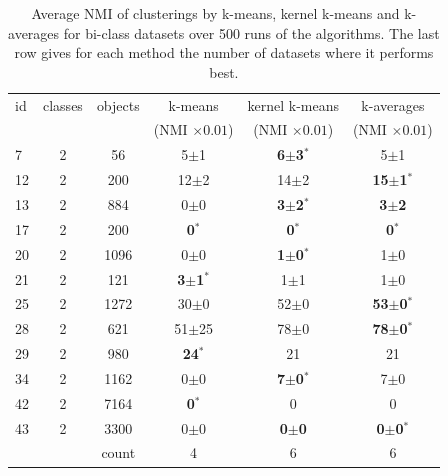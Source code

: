 \documentclass[a4paper,twoside]{article}
\begin{document}
\begin{table} 
\begin{center} 
\small 
 \setlength{\tabcolsep}{1em}
 \renewcommand{\arraystretch}{1.2}
\begin{tabular}{lccccc} 
id & classes & objects & k-means & kernel k-means & k-averages \\ 
&  &  & (NMI $\times 0.01$) & (NMI $\times 0.01$) & (NMI $\times 0.01$) \\ 
\hline 
 7 & 2 &   56 & 5$\pm$1 & \textbf{6$\pm$3$^*$} & 5$\pm$1 \\ 
12 & 2 &  200 & 12$\pm$2 & 14$\pm$2 & \textbf{15$\pm$1$^*$} \\ 
13 & 2 &  884 & 0$\pm$0 & \textbf{3$\pm$2$^*$} & \textbf{3$\pm$2} \\ 
17 & 2 &  200 & \textbf{0$^*$} & \textbf{0$^*$} & \textbf{0$^*$} \\ 
20 & 2 & 1096 & 0$\pm$0 & \textbf{1$\pm$0$^*$} & 1$\pm$0 \\ 
21 & 2 &  121 & \textbf{3$\pm$1$^*$} & 1$\pm$1 & 1$\pm$0 \\ 
25 & 2 & 1272 & 30$\pm$0 & 52$\pm$0 & \textbf{53$\pm$0$^*$} \\ 
28 & 2 &  621 & 51$\pm$25 &  78$\pm$0 & \textbf{ 78$\pm$0$^*$} \\ 
29 & 2 &  980 & \textbf{24$^*$} & 21 & 21 \\ 
34 & 2 & 1162 & 0$\pm$0 & \textbf{7$\pm$0$^*$} & 7$\pm$0 \\ 
42 & 2 & 7164 & \textbf{0$^*$} & 0 & 0 \\ 
43 & 2 & 3300 & 0$\pm$0 & \textbf{0$\pm$0} & \textbf{0$\pm$0$^*$} \\ 
\hline 
 &  & count & 4 & 6 & 6 \\ 
\end{tabular} 
\end{center} 
\caption{Average NMI of clusterings by k-means, kernel k-means and k-averages for bi-class datasets over 500 runs of the algorithms. The last row gives for each method the number of datasets where it performs best.}
\label{tab:results-2} 
\end{table} 
 
 
\end{document}
